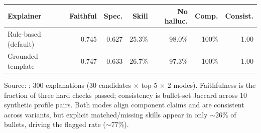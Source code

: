 \caption{Offline explanation-quality audit (top-5 composite matches, $K{=}5$).}
\label{tab:explainability}
\scriptsize
\setlength{\tabcolsep}{3pt}
\begin{tabular}{@{}lrrrrrr@{}}
\toprule
Explainer & Faithful & Spec. & Skill & No halluc. & Comp. & Consist. \\
\midrule
Rule-based (default) & 0.745 & 0.627 & 25.3\% & 98.0\% & 100\% & 1.00 \\
Grounded template & 0.747 & 0.633 & 26.7\% & 97.3\% & 100\% & 1.00 \\
\bottomrule
\end{tabular}
\normalsize
\par\vspace{0.4em}
\footnotesize{Source: ; 300 explanations (30 candidates $\times$ top-5 $\times$ 2 modes). Faithfulness is the fraction of three hard checks passed; consistency is bullet-set Jaccard across 10 synthetic profile pairs. Both modes align component claims and are consistent across variants, but explicit matched/missing skills appear in only ${\sim}26\%$ of bullets, driving the flagged rate (${\sim}77\%$).}
